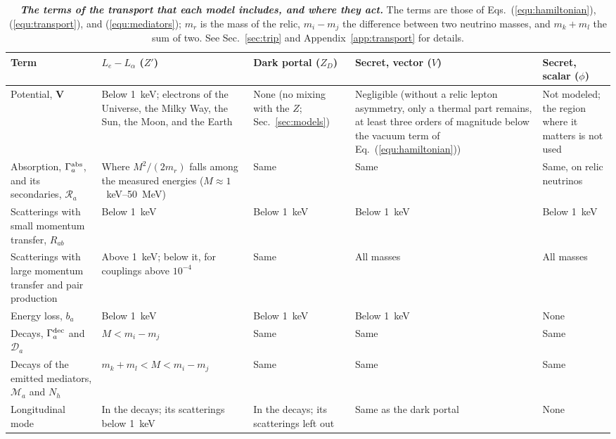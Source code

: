 \documentclass[linenumbers, aps, prd, twocolumn, superscriptaddress, floatfix, longbibliography, nofootinbib, bibnotes]{revtex4-2}
\begin{document}
\begin{table}[t!]
 \caption{\label{tab:terms}\textbf{\textit{The terms of the transport that each model includes, and where they act.}} The terms are those of Eqs.~(\ref{equ:hamiltonian}), (\ref{equ:transport}), and (\ref{equ:mediators}); $m_r$ is the mass of the relic, $m_i - m_j$ the difference between two neutrino masses, and $m_k + m_l$ the sum of two. See Sec.~\ref{sec:trip} and Appendix~\ref{app:transport} for details.}
 \begin{ruledtabular}
 \begin{tabular}{>{\raggedright\arraybackslash}p{}>{\raggedright\arraybackslash}p{}>{\raggedright\arraybackslash}p{}>{\raggedright\arraybackslash}p{}>{\raggedright\arraybackslash}p{}}
 Term & $L_e - L_\alpha$ ($Z'$) & Dark portal ($Z_D$) & Secret, vector ($V$) & Secret, scalar ($\phi$) \\
 \hline
 Potential, $\mathbf{V}$ & Below 1~keV; electrons of the Universe, the Milky Way, the Sun, the Moon, and the Earth & None (no mixing with the $Z$; Sec.~\ref{sec:models}) & Negligible (without a relic lepton asymmetry, only a thermal part remains, at least three orders of magnitude below the vacuum term of Eq.~(\ref{equ:hamiltonian})) & Not modeled; the region where it matters is not used \\
 Absorption, $\Gamma^{\rm abs}_a$, and its secondaries, $\mathcal{R}_a$ & Where $M^2/(2 m_r)$ falls among the measured energies ($M \approx 1$~keV--50~MeV) & Same & Same & Same, on relic neutrinos \\
 Scatterings with small momentum transfer, $R_{ab}$ & Below 1~keV & Below 1~keV & Below 1~keV & Below 1~keV \\
 Scatterings with large momentum transfer and pair production & Above 1~keV; below it, for couplings above $10^{-4}$ & Same & All masses & All masses \\
 Energy loss, $b_a$ & Below 1~keV & Below 1~keV & Below 1~keV & None \\
 Decays, $\Gamma^{\rm dec}_a$ and $\mathcal{D}_a$ & $M < m_i - m_j$ & Same & Same & Same \\
 Decays of the emitted mediators, $\mathcal{M}_a$ and $N_h$ & $m_k + m_l < M < m_i - m_j$ & Same & Same & Same \\
 Longitudinal mode & In the decays; its scatterings below 1~keV & In the decays; its scatterings left out & Same as the dark portal & None \\
 \end{tabular}
 \end{ruledtabular}
\end{table}
\end{document}
